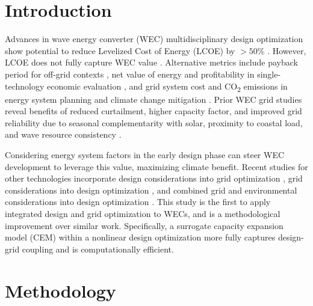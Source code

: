 
\section{Introduction}
Advances in wave energy converter (WEC) multidisciplinary design optimization show potential to reduce Levelized Cost of Energy (LCOE) by $>50\%$ \cite{mccabe_leveraging_2026}.
However, LCOE does not fully capture WEC value \cite{mowers_evaluation_2021,moraski_beyond_2025}.
Alternative metrics include payback period for off-grid contexts \cite{jenne_powering_2021}, net value of energy and profitability in single-technology economic evaluation \cite{mowers_evaluation_2021,makaremi_economic_2025}, and grid system cost and CO\textsubscript{2} emissions in energy system planning and climate change mitigation \cite{moraski_beyond_2025}.
Prior WEC grid studies reveal benefits of reduced curtailment, higher capacity factor, and improved grid reliability due to seasonal complementarity with solar, proximity to coastal load, and wave resource consistency \cite{akdemir_opportunities_2023,bhattacharya_timing_2021,pennock_temporal_2022}.

Considering energy system factors in the early design phase can steer WEC development to leverage this value, maximizing climate benefit.
Recent studies for other technologies incorporate design considerations into grid optimization \cite{schwartz_value_2023,ricks_value_2022}, grid considerations into design optimization \cite{mehta_designing_2024}, and combined grid and environmental considerations into design optimization \cite{canet_eco-conscious_2023,kainz_how_2024}.
This study is the first to apply integrated design and grid optimization to WECs, and is a methodological improvement over similar work. 
Specifically, a surrogate capacity expansion model (CEM) within a nonlinear design optimization more fully captures design-grid coupling and is computationally efficient.

\section{Methodology}
